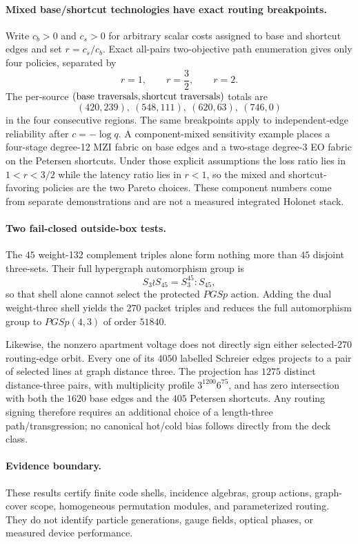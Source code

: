 \paragraph{Mixed base/shortcut technologies have exact routing breakpoints.}
Write $c_b>0$ and $c_s>0$ for arbitrary scalar costs assigned to base and shortcut edges and set $r=c_s/c_b$.  Exact all-pairs two-objective path enumeration gives only four policies, separated by
\[
r=1,\qquad r=\frac32,\qquad r=2.
\]
The per-source $(\hbox{base traversals},\hbox{shortcut traversals})$ totals are
\[
(420,239),\ (548,111),\ (620,63),\ (746,0)
\]
in the four consecutive regions.  The same breakpoints apply to independent-edge reliability after $c=-\log q$.  A component-mixed sensitivity example places a four-stage degree-12 MZI fabric on base edges and a two-stage degree-3 EO fabric on the Petersen shortcuts.  Under those explicit assumptions the loss ratio lies in $1<r<3/2$ while the latency ratio lies in $r<1$, so the mixed and shortcut-favoring policies are the two Pareto choices.  These component numbers come from separate demonstrations and are not a measured integrated Holonet stack.

\paragraph{Two fail-closed outside-box tests.}
The $45$ weight-132 complement triples alone form nothing more than $45$ disjoint three-sets.  Their full hypergraph automorphism group is
\[
S_3\wr S_{45}=S_3^{45}:S_{45},
\]
so that shell alone cannot select the protected $PGSp$ action.  Adding the dual weight-three shell yields the $270$ packet triples and reduces the full automorphism group to $PGSp(4,3)$ of order $51840$.

Likewise, the nonzero apartment voltage does not directly sign either selected-270 routing-edge orbit.  Every one of its $4050$ labelled Schreier edges projects to a pair of selected lines at graph distance three.  The projection has $1275$ distinct distance-three pairs, with multiplicity profile $3^{1200}6^{75}$, and has zero intersection with both the $1620$ base edges and the $405$ Petersen shortcuts.  Any routing signing therefore requires an additional choice of a length-three path/transgression; no canonical hot/cold bias follows directly from the deck class.

\paragraph{Evidence boundary.}
These results certify finite code shells, incidence algebras, group actions, graph-cover scope, homogeneous permutation modules, and parameterized routing.  They do not identify particle generations, gauge fields, optical phases, or measured device performance.
